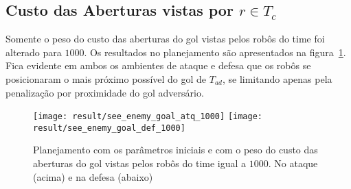 \subsection{Custo das Aberturas vistas por $r \in T_c$}
Somente o peso do custo das aberturas do gol vistas pelos robôs do time foi
alterado para $1000$. Os resultados no planejamento são
apresentados na figura~\ref{fig:see_enemy_goal_1000}. Fica evidente em
ambos os ambientes de ataque e defesa que os robôs se posicionaram
o mais próximo possível do gol de $T_{ad}$, se limitando apenas
pela penalização por proximidade do gol adversário.

\begin{figure}[H]
  \centering
  \texttt{[image: result/see\_enemy\_goal\_atq\_1000]}
  \texttt{[image: result/see\_enemy\_goal\_def\_1000]}
  \caption{Planejamento com os parâmetros iniciais e com o peso do custo
           das aberturas do gol vistas pelos robôs do time igual a $1000$.
           No ataque (acima) e na defesa (abaixo)}\label{fig:see_enemy_goal_1000}
\end{figure}
